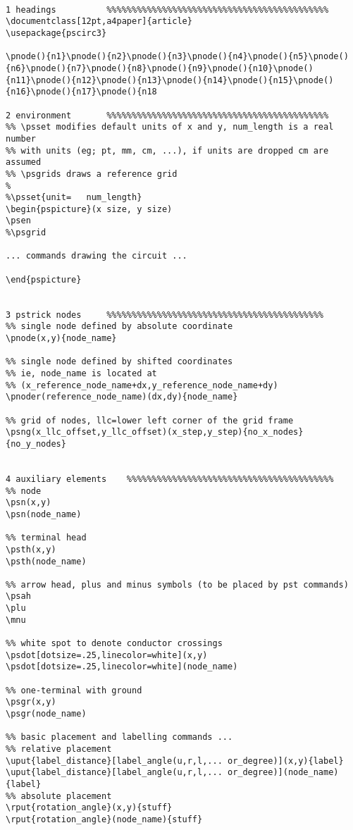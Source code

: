 \documentclass[12pt,a4paper]{article}
\begin{document}
\begin{verbatim}

1 headings			%%%%%%%%%%%%%%%%%%%%%%%%%%%%%%%%%%%%%%%%%%%%
\documentclass[12pt,a4paper]{article}
\usepackage{pscirc3}

\pnode(){n1}\pnode(){n2}\pnode(){n3}\pnode(){n4}\pnode(){n5}\pnode(){n6}\pnode(){n7}\pnode(){n8}\pnode(){n9}\pnode(){n10}\pnode(){n11}\pnode(){n12}\pnode(){n13}\pnode(){n14}\pnode(){n15}\pnode(){n16}\pnode(){n17}\pnode(){n18

2 environment		%%%%%%%%%%%%%%%%%%%%%%%%%%%%%%%%%%%%%%%%%%%%
%% \psset modifies default units of x and y, num_length is a real number
%% with units (eg; pt, mm, cm, ...), if units are dropped cm are assumed
%% \psgrids draws a reference grid
%
%\psset{unit=	num_length}
\begin{pspicture}(x size, y size)
\psen
%\psgrid

... commands drawing the circuit ...

\end{pspicture}


3 pstrick nodes		%%%%%%%%%%%%%%%%%%%%%%%%%%%%%%%%%%%%%%%%%%%
%% single node defined by absolute coordinate
\pnode(x,y){node_name}

%% single node defined by shifted coordinates
%% ie, node_name is located at
%% (x_reference_node_name+dx,y_reference_node_name+dy)
\pnoder(reference_node_name)(dx,dy){node_name}

%% grid of nodes, llc=lower left corner of the grid frame
\psng(x_llc_offset,y_llc_offset)(x_step,y_step){no_x_nodes}{no_y_nodes}


4 auxiliary elements	%%%%%%%%%%%%%%%%%%%%%%%%%%%%%%%%%%%%%%%%%
%% node
\psn(x,y)
\psn(node_name)

%% terminal head
\psth(x,y)
\psth(node_name)

%% arrow head, plus and minus symbols (to be placed by pst commands)
\psah
\plu
\mnu

%% white spot to denote conductor crossings
\psdot[dotsize=.25,linecolor=white](x,y)
\psdot[dotsize=.25,linecolor=white](node_name)

%% one-terminal with ground
\psgr(x,y)
\psgr(node_name)

%% basic placement and labelling commands ...
%% relative placement
\uput{label_distance}[label_angle(u,r,l,... or_degree)](x,y){label}
\uput{label_distance}[label_angle(u,r,l,... or_degree)](node_name){label}
%% absolute placement
\rput{rotation_angle}(x,y){stuff}
\rput{rotation_angle}(node_name){stuff}


\end{verbatim}
\end{document}
